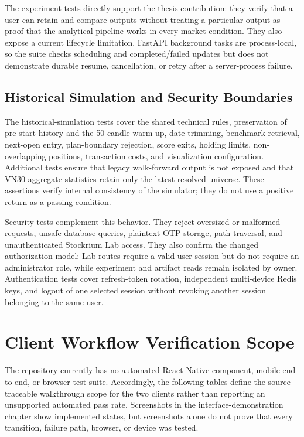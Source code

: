The experiment tests directly support the thesis contribution: they verify that a user can retain and compare outputs without treating a particular output as proof that the analytical pipeline works in every market condition. They also expose a current lifecycle limitation. FastAPI background tasks are process-local, so the suite checks scheduling and completed/failed updates but does not demonstrate durable resume, cancellation, or retry after a server-process failure.

\subsection{Historical Simulation and Security Boundaries}
\label{subsec:simulation-security-testing}

The historical-simulation tests cover the shared technical rules, preservation of pre-start history and the 50-candle warm-up, date trimming, benchmark retrieval, next-open entry, plan-boundary rejection, score exits, holding limits, non-overlapping positions, transaction costs, and visualization configuration. Additional tests ensure that legacy walk-forward output is not exposed and that VN30 aggregate statistics retain only the latest resolved universe. These assertions verify internal consistency of the simulator; they do not use a positive return as a passing condition.

Security tests complement this behavior. They reject oversized or malformed requests, unsafe database queries, plaintext OTP storage, path traversal, and unauthenticated Stockrium Lab access. They also confirm the changed authorization model: Lab routes require a valid user session but do not require an administrator role, while experiment and artifact reads remain isolated by owner. Authentication tests cover refresh-token rotation, independent multi-device Redis keys, and logout of one selected session without revoking another session belonging to the same user.

\section{Client Workflow Verification Scope}
\label{sec:client-workflow-verification}

The repository currently has no automated React Native component, mobile end-to-end, or browser test suite. Accordingly, the following tables define the source-traceable walkthrough scope for the two clients rather than reporting an unsupported automated pass rate. Screenshots in the interface-demonstration chapter show implemented states, but screenshots alone do not prove that every transition, failure path, browser, or device was tested.

